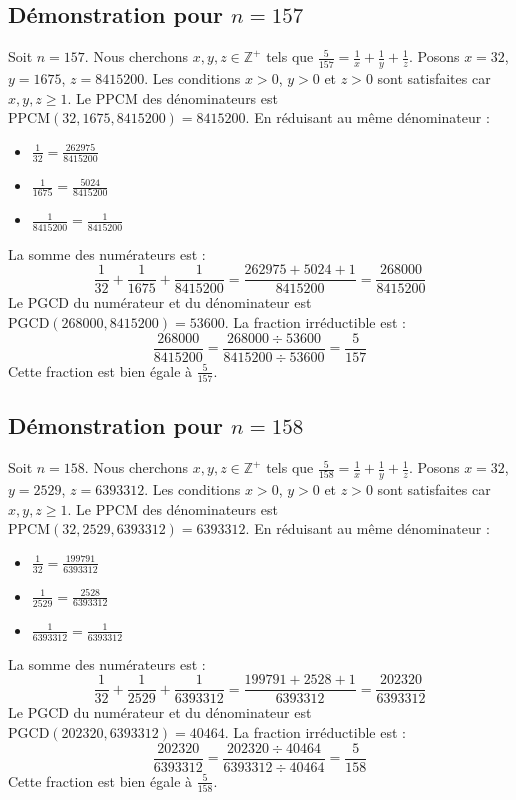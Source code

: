 \documentclass[11pt,a4paper]{article}
\begin{document}
\subsection{Démonstration pour $n = 157$}
Soit $n = 157$. Nous cherchons $x, y, z \in \mathbb{Z}^{+}$ tels que $\frac{5}{157} = \frac{1}{x} + \frac{1}{y} + \frac{1}{z}$.
Posons $x = 32$, $y = 1675$, $z = 8415200$.
Les conditions $x > 0$, $y > 0$ et $z > 0$ sont satisfaites car $x, y, z \geq 1$.
Le PPCM des dénominateurs est $\text{PPCM}(32, 1675, 8415200) = 8415200$.
En réduisant au même dénominateur :
\begin{itemize}
    \item $\frac{1}{32} = \frac{262975}{8415200}$
    \item $\frac{1}{1675} = \frac{5024}{8415200}$
    \item $\frac{1}{8415200} = \frac{1}{8415200}$
\end{itemize}
La somme des numérateurs est :
$$ \frac{1}{32} + \frac{1}{1675} + \frac{1}{8415200} = \frac{262975 + 5024 + 1}{8415200} = \frac{268000}{8415200} $$
Le PGCD du numérateur et du dénominateur est $\text{PGCD}(268000, 8415200) = 53600$.
La fraction irréductible est :
$$ \frac{268000}{8415200} = \frac{268000 \div 53600}{8415200 \div 53600} = \frac{5}{157} $$
Cette fraction est bien égale à $\frac{5}{157}$.

\subsection{Démonstration pour $n = 158$}
Soit $n = 158$. Nous cherchons $x, y, z \in \mathbb{Z}^{+}$ tels que $\frac{5}{158} = \frac{1}{x} + \frac{1}{y} + \frac{1}{z}$.
Posons $x = 32$, $y = 2529$, $z = 6393312$.
Les conditions $x > 0$, $y > 0$ et $z > 0$ sont satisfaites car $x, y, z \geq 1$.
Le PPCM des dénominateurs est $\text{PPCM}(32, 2529, 6393312) = 6393312$.
En réduisant au même dénominateur :
\begin{itemize}
    \item $\frac{1}{32} = \frac{199791}{6393312}$
    \item $\frac{1}{2529} = \frac{2528}{6393312}$
    \item $\frac{1}{6393312} = \frac{1}{6393312}$
\end{itemize}
La somme des numérateurs est :
$$ \frac{1}{32} + \frac{1}{2529} + \frac{1}{6393312} = \frac{199791 + 2528 + 1}{6393312} = \frac{202320}{6393312} $$
Le PGCD du numérateur et du dénominateur est $\text{PGCD}(202320, 6393312) = 40464$.
La fraction irréductible est :
$$ \frac{202320}{6393312} = \frac{202320 \div 40464}{6393312 \div 40464} = \frac{5}{158} $$
Cette fraction est bien égale à $\frac{5}{158}$.
\end{document}
